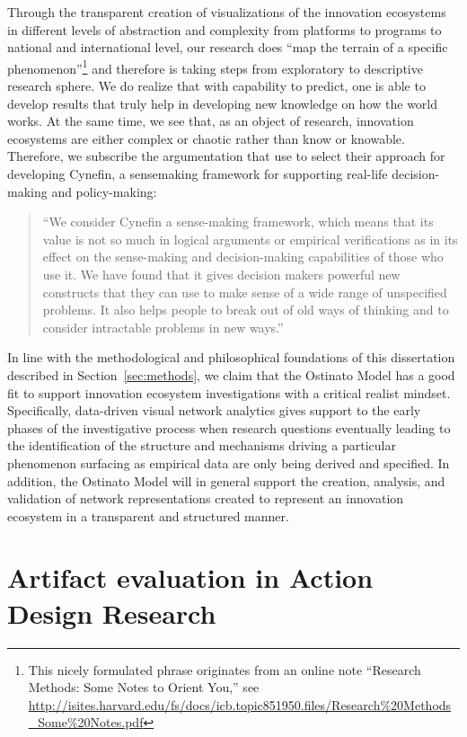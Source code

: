 Through the transparent creation of visualizations of the innovation ecosystems in different levels of abstraction and complexity from platforms to programs to national and international level, our research does ``map the terrain of a specific phenomenon''\footnote{This nicely formulated phrase originates from an online note ``Research Methods: Some Notes to Orient You,'' see \url{http://isites.harvard.edu/fs/docs/icb.topic851950.files/Research\%20Methods_Some\%20Notes.pdf}} and therefore is taking steps from exploratory to descriptive research sphere. We do realize that with capability to predict, one is able to develop results that truly help in developing new knowledge on how the world works. At the same time, we see that, as an object of research, innovation ecosystems are either complex or chaotic rather than know or knowable. Therefore, we subscribe the argumentation that \cite{Kurtz2003} use to select their approach for developing Cynefin, a sensemaking framework for supporting real-life decision-making and policy-making: 
 
\begin{quote} ``We consider Cynefin a sense-making framework, which means that its value is not so much in logical arguments or empirical verifications as in its effect on the sense-making and decision-making capabilities of those who use it. We have found that it gives decision makers powerful new constructs that they can use to make sense of a wide range of unspecified problems. It also helps people to break out of old ways of thinking and to consider intractable problems in new ways.'' \citep{Kurtz2003}
\end{quote}

In line with the methodological and philosophical foundations of this dissertation described in Section~\ref{sec:methods}, we claim that the Ostinato  Model has a good fit to support innovation ecosystem investigations with a critical realist mindset. Specifically, data-driven visual network analytics gives support to the early phases of the investigative process when research questions eventually leading to the identification of the structure and mechanisms driving a particular phenomenon surfacing as empirical data are only being derived and specified. In addition, the Ostinato Model will in general support the creation, analysis, and validation of network representations created to represent an innovation ecosystem in a transparent and structured manner. 

\section{Artifact evaluation in Action Design Research}
\label{sec:evaluation}

